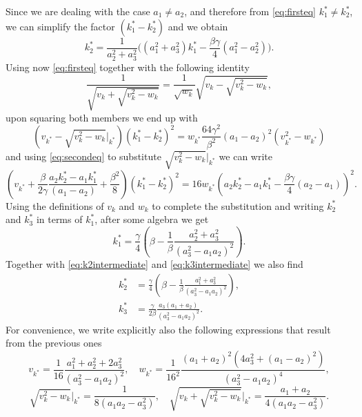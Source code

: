\documentclass[a4paper,11pt]{article}
\numberwithin{equation}{section}
\begin{document}
Since we are dealing with the case $a_1 \neq a_2$, and therefore from \eqref{eq:firsteq} $k_1^* \neq k_2^*$, we can simplify the factor $(k_1^*-k_2^*)$ and we obtain
\begin{equation}\label{eq:k2intermediate}
    k_2^* = \frac{1}{a_2^2+a_3^2}\Big( (a_1^2 + a_3^2)k_1^* -\frac{\beta\gamma}{4}(a_1^2-a_2^2) \Big) .
\end{equation}
Using now \eqref{eq:firsteq} together with the following identity
\begin{equation*}
    \frac{1}{\sqrt{  v_k + \sqrt{v_k^2 - w_k}} } = \frac{1}{\sqrt{w_k}} \sqrt{  v_k - \sqrt{v_k^2 - w_k}} ,
\end{equation*}
upon squaring both members we end up with
\begin{equation*}
   \left( v_{k^*} - \sqrt{v_k^2-w_k}\big\vert_{k^*} \right)(k_1^*-k_2^*)^2 =  w_{k^*}\frac{64 \gamma^2}{\beta^2} (a_1-a_2)^2 (v_{k^*}^2- w_{k^*}) 
\end{equation*}
and using \eqref{eq:secondeq} to substitute $\sqrt{v_k^2-w_k}\big\vert_{k^*}$ we can write
\begin{equation*}
  \left( v_{k^*} + \frac{\beta}{2\gamma} \frac{a_2 k_2^* - a_1 k_1^*}{(a_1-a_2)} + \frac{\beta^2}{8} \right)(k_1^*-k_2^*)^2  = 16 w_{k^*} \left( a_2 k_2^* - a_1 k_1^* - \frac{\beta\gamma}{4}(a_2 - a_1) \right)^2.
\end{equation*}
Using the definitions of $v_k$ and $w_k$ to complete the substitution and writing $k_2^*$ and $k_3^*$ in terms of $k_1^*$, after some algebra we get
\begin{equation}
    k_1^* = \frac{\gamma}{4} \left( \beta - \frac{1}{\beta}\frac{a_2^2+a_3^2}{(a_3^2 - a_1 a_2)^2} \right) .
\end{equation}
Together with \eqref{eq:k2intermediate} and \eqref{eq:k3intermediate} we also find
\begin{align}
    k_2^* &= \frac{\gamma}{4} \left( \beta - \frac{1}{\beta}\frac{a_1^2+a_3^2}{(a_3^2 - a_1 a_2)^2} \right) , \\
    k_3^* &= \frac{\gamma}{2\beta} \frac{a_3 (a_1+a_2) }{(a_3^2 - a_1 a_2)^2} . 
\end{align}
For convenience, we write explicitly also the following expressions that result from the previous ones
\begin{equation*}
    v_{k^*}= \frac{1}{16} \frac{a_1^2+a_2^2 + 2 a_3^2}{(a_3^2 - a_1 a_2)^2}, \quad w_{k^*}= \frac{1}{16^2} \frac{(a_1+a_2)^2(4a_3^2 + (a_1-a_2)^2)}{(a_3^2 - a_1 a_2)^4} ,
\end{equation*}
\begin{equation*}
    \sqrt{v_k^2-w_k}\Big\vert_{k^*} = \frac{1}{8(a_1a_2 - a_3^2)}, \quad \sqrt{v_k + \sqrt{v_k^2-w_k}} \Bigg\vert_{k^*} = \frac{a_1+a_2}{4(a_1a_2 - a_3^2)}.
\end{equation*}
\end{document}
